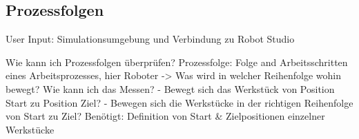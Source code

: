 \subsection{Prozessfolgen}
\label{ssec:Prozessfolgen}
User Input: Simulationsumgebung und Verbindung zu Robot Studio

Wie kann ich Prozessfolgen überprüfen? Prozessfolge: Folge and Arbeitsschritten
eines Arbeitsprozesses, hier Roboter -> Was wird in welcher Reihenfolge wohin
bewegt? Wie kann ich das Messen? - Bewegt sich das Werkstück von Position Start
zu Position Ziel? - Bewegen sich die Werkstücke in der richtigen Reihenfolge
von Start zu Ziel? Benötigt: Definition von Start \& Zielpositionen einzelner
Werkstücke